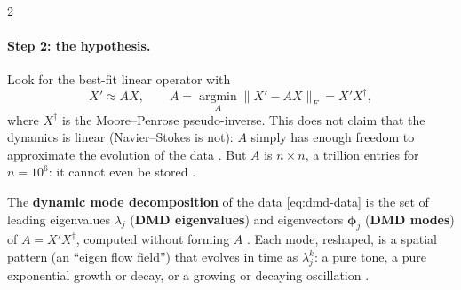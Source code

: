\begin{paracol}{2}
\paragraph{Step 2: the hypothesis.} Look for the best-fit linear operator with 
\begin{equation}\label{eq:dmd-A}
  X'\approx AX,\qquad A=\operatorname*{argmin}_A\lVert X'-AX\rVert_F=X'X^{\dagger},
\end{equation}
where $X^\dagger$ is the Moore--Penrose pseudo-inverse. This does not claim that the dynamics is linear
(Navier--Stokes is not): $A$ simply has enough freedom to approximate the evolution of the data
. But $A$ is $n\times n$, a trillion entries for $n=10^6$: it cannot even be stored
.

\begin{definition}\label{def:dmd}
The \textbf{dynamic mode decomposition} of the data \eqref{eq:dmd-data} is the set of leading eigenvalues
$\lambda_j$ (\textbf{DMD eigenvalues}) and eigenvectors $\boldsymbol\phi_j$ (\textbf{DMD modes}) of
$A=X'X^\dagger$, computed without forming $A$ . Each mode, reshaped, is a
spatial pattern (an ``eigen flow field'') that evolves in time as $\lambda_j^k$: a pure tone, a pure
exponential growth or decay, or a growing or decaying oscillation .
\end{definition}


\end{paracol}
